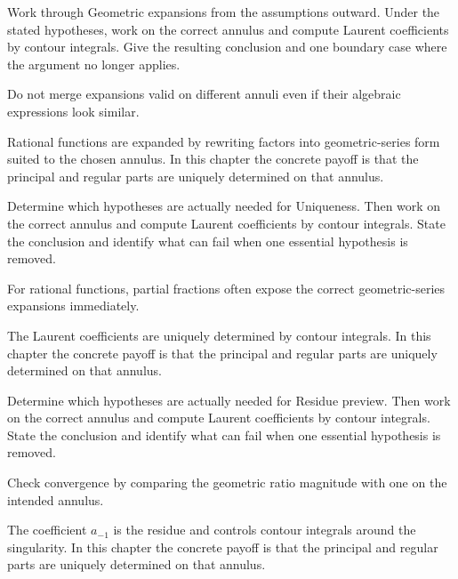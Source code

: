 \begin{exercise}\label{exr:iv08-06}
Work through Geometric expansions from the assumptions outward. Under the stated hypotheses, work on the correct annulus and compute Laurent coefficients by contour integrals. Give the resulting conclusion and one boundary case where the argument no longer applies.
\end{exercise}
\begin{hint}
Do not merge expansions valid on different annuli even if their algebraic expressions look similar.
\end{hint}
\begin{solution}
Rational functions are expanded by rewriting factors into geometric-series form suited to the chosen annulus. In this chapter the concrete payoff is that the principal and regular parts are uniquely determined on that annulus.
\end{solution}

\begin{exercise}\label{exr:iv08-07}
Determine which hypotheses are actually needed for Uniqueness. Then work on the correct annulus and compute Laurent coefficients by contour integrals. State the conclusion and identify what can fail when one essential hypothesis is removed.
\end{exercise}
\begin{hint}
For rational functions, partial fractions often expose the correct geometric-series expansions immediately.
\end{hint}
\begin{solution}
The Laurent coefficients are uniquely determined by contour integrals. In this chapter the concrete payoff is that the principal and regular parts are uniquely determined on that annulus.
\end{solution}

\begin{exercise}\label{exr:iv08-08}
Determine which hypotheses are actually needed for Residue preview. Then work on the correct annulus and compute Laurent coefficients by contour integrals. State the conclusion and identify what can fail when one essential hypothesis is removed.
\end{exercise}
\begin{hint}
Check convergence by comparing the geometric ratio magnitude with one on the intended annulus.
\end{hint}
\begin{solution}
The coefficient $a_{-1}$ is the residue and controls contour integrals around the singularity. In this chapter the concrete payoff is that the principal and regular parts are uniquely determined on that annulus.
\end{solution}

